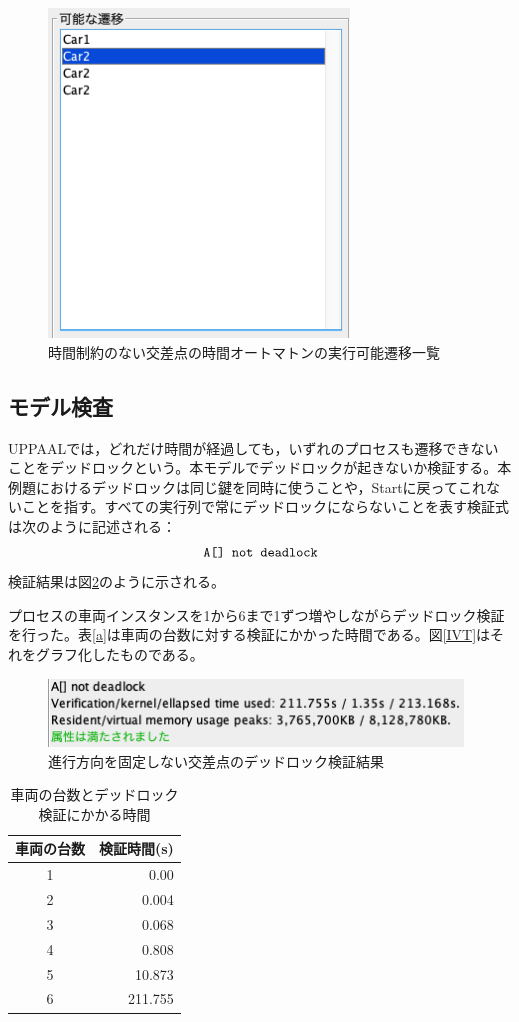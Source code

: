 \documentclass{tpu-sotu}
\begin{document}
	\begin{figure}[htbp]
	\centering
	\includegraphics[width=80mm]{IBSimuTra.png}
	\caption{時間制約のない交差点の時間オートマトンの実行可能遷移一覧}
	\label{IBST}
	\end{figure}
	\subsection{モデル検査}
	UPPAALでは，どれだけ時間が経過しても，いずれのプロセスも遷移できないことをデッドロックという。本モデルでデッドロックが起きないか検証する。本例題におけるデッドロックは同じ鍵を同時に使うことや，Startに戻ってこれないことを指す。すべての実行列で常にデッドロックにならないことを表す検証式は次のように記述される：
	\[
	\mbox{\tt{A[] not deadlock}}
	\]
	検証結果は図\ref{IBC6}のように示される。
	
	プロセスの車両インスタンスを1から6まで1ずつ増やしながらデッドロック検証を行った。表\ref{a}は車両の台数に対する検証にかかった時間である。図\ref{IVT}はそれをグラフ化したものである。
	\begin{figure}[htbp]
	\centering
	\includegraphics[width=110mm]{InterBigCar6.png}
	\caption{進行方向を固定しない交差点のデッドロック検証結果}
	\label{IBC6}
	\end{figure}
	
	\begin{table}[htb]
	\centering
	\caption{車両の台数とデッドロック検証にかかる時間}
	\label{a}
	 \begin{tabular}{|c|r|} \hline
	    車両の台数 & 検証時間(s)  \\ \hline
	   1& 0.00  \\ \hline
	   2 & 0.004 \\ \hline
	   3 & 0.068 \\ \hline
	   4 & 0.808 \\ \hline
	   5 & 10.873 \\ \hline
	   6 & 211.755\\ \hline
	 \end{tabular}
	 \label{testcase}
	\end{table}
	
\end{document}
